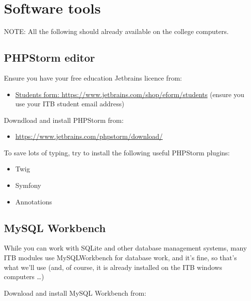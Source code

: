 \documentclass[a4paperpaper,openright]{book}
\providecommand{\tightlist}{%
  \setlength{\itemsep}{0pt}\setlength{\parskip}{0pt}}
\begin{document}
\hypertarget{software-tools-1}{%
\chapter{\texorpdfstring{Software
tools\label{appendix_software_setup}}{Software tools}}\label{software-tools-1}}

NOTE: All the following should already available on the college
computers.

\hypertarget{phpstorm-editor}{%
\section{PHPStorm editor}\label{phpstorm-editor}}

Ensure you have your free education Jetbrains licence from:

\begin{itemize}
\tightlist
\item
  \href{https://www.jetbrains.com/shop/eform/students}{Students form:
  https://www.jetbrains.com/shop/eform/students} (ensure you use your
  ITB student email address)
\end{itemize}

Downdload and install PHPStorm from:

\begin{itemize}
\tightlist
\item
  \url{https://www.jetbrains.com/phpstorm/download/}
\end{itemize}

To save lots of typing, try to install the following useful PHPStorm
plugins:

\begin{itemize}
\tightlist
\item
  Twig
\item
  Symfony
\item
  Annotations
\end{itemize}

\hypertarget{mysql-workbench}{%
\section{MySQL Workbench}\label{mysql-workbench}}

While you can work with SQLite and other database management systems,
many ITB modules use MySQLWorkbench for database work, and it's fine, so
that's what we'll use (and, of course, it is already installed on the
ITB windows computers \ldots{})

Download and install MySQL Workbench from:
\end{document}
